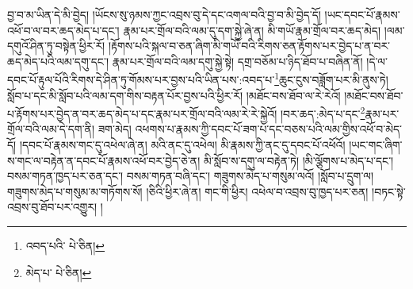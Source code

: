 བྱ་བ་མ་ཡིན་དེ་མི་བྱེད། །ཡོངས་སུ་ཉམས་ཀྱང་འབྲས་བུ་དེ་དང་འགལ་བའི་བྱ་བ་མི་བྱེད་དོ། །ཡང་དབང་པོ་རྣམས་འཕོ་བ་ལ་བར་ཆད་མེད་པ་དང་། རྣམ་པར་གྲོལ་བའི་ལམ་དུ་དག་སྐྱེ་ཞེ་ན། མི་གཡོ་རྣམ་གྲོལ་བར་ཆད་མེད། །ལམ་དགུའོ་ཤིན་ཏུ་བསྟེན་ཕྱིར་རོ། །རྟོགས་པའི་སྐལ་བ་ཅན་ཞིག་མི་གཡོ་བའི་རིགས་ཅན་རྟོགས་པར་བྱེད་པ་ན་བར་ཆད་མེད་པའི་ལམ་དགུ་དང་། རྣམ་པར་གྲོལ་བའི་ལམ་དགུ་སྐྱེ་སྟེ། དགྲ་བཅོམ་པ་ཉིད་ཐོབ་པ་བཞིན་ནོ། །དེ་ལ་དབང་པོ་རྟུལ་པོའི་རིགས་དེ་ཤིན་ཏུ་གོམས་པར་བྱས་པའི་ཡིན་པས་:འབད་པ་\footnote{འབད་པའི་  པེ་ཅིན། }ཆུང་ངུས་བཟློག་པར་མི་ནུས་ཏེ། སློབ་པ་དང་མི་སློབ་པའི་ལམ་དག་གིས་བརྟན་པོར་བྱས་པའི་ཕྱིར་རོ། །མཐོང་བས་ཐོབ་ལ་རེ་རེའོ། །མཐོང་བས་ཐོབ་པ་རྟོགས་པར་བྱེད་ན་བར་ཆད་མེད་པ་དང་རྣམ་པར་གྲོལ་བའི་ལམ་རེ་རེ་སྐྱེའོ། །བར་ཆད་:མེད་པ་དང་\footnote{མེད་པ་  པེ་ཅིན། }རྣམ་པར་གྲོལ་བའི་ལམ་དེ་དག་ནི། ཟག་མེད། འཕགས་པ་རྣམས་ཀྱི་དབང་པོ་ཟག་པ་དང་བཅས་པའི་ལམ་གྱིས་འཕོ་བ་མེད་དོ། །དབང་པོ་རྣམས་གང་དུ་འཕེལ་ཞེ་ན། མའི་ནང་དུ་འཕེལ། མི་རྣམས་ཀྱི་ནང་དུ་དབང་པོ་འཕོའོ། །ཡང་གང་ཞིག་ས་གང་ལ་བརྟེན་ན་དབང་པོ་རྣམས་འཕོ་བར་བྱེད་ཅེ་ན། མི་སློབ་ས་དགུ་ལ་བརྟེན་ཏེ། །མི་ལྕོགས་པ་མེད་པ་དང་། བསམ་གཏན་ཁྱད་པར་ཅན་དང་། བསམ་གཏན་བཞི་དང་། གཟུགས་མེད་པ་གསུམ་ལའོ། །སློབ་པ་དྲུག་ལ། གཟུགས་མེད་པ་གསུམ་མ་གཏོགས་སོ། །ཅིའི་ཕྱིར་ཞེ་ན། གང་གི་ཕྱིར། འཕེལ་བ་འབྲས་བུ་ཁྱད་པར་ཅན། །བཏང་སྟེ་འབྲས་བུ་ཐོབ་པར་འགྱུར། །
